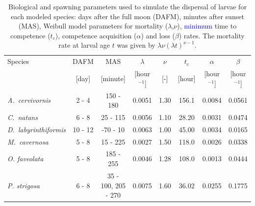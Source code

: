 \documentclass[preprint,12pt,authoryear]{elsarticle}
\newcommand{\modif}[1]{\textcolor{blue}{#1}}
\begin{document}
	\begin{table}
		\begin{adjustwidth}{-1in}{-1in}
			\centering
			\footnotesize
			\begin{tabular}{lccccccc}
				\hline
				Species & DAFM  & MAS      &  $\lambda$     & $\nu$ & $t_c$  & $\alpha$      & $\beta$ \\
				& [day] & [minute] &  [hour$^{-1}$] & [-]   & [hour] & [hour$^{-1}$] & [hour$^{-1}$] \\
				\hline
				\textit{A.~cervivornis} & 2 - 4 & 150 - 180 & 0.0051 & 1.30 & 156.1 & 0.0084 & 0.0561 \\
				\textit{C.~natans}      & 6 - 8 & 25 - 115  &  0.0056 & 1.10 & 28.20 & 0.0031 & 0.0474 \\
				\textit{D.~labyrinthiformis} & 10 - 12 & -70 - 10 & 0.0063 & 1.00 &  45.00 & 0.0034 & 0.0165 \\
				\textit{M.~cavernosa}   & 5 - 8 & 15 - 225 & 0.0027 & 1.50 & 118.0 & 0.0026 & 0.0338 \\
				\textit{O. faveolata}   & 5 - 8 & 185 - 255 &  0.0046 & 1.28 & 108.0 & 0.0013 & 0.0444 \\
				\textit{P. strigosa}    & 6 - 8 &  35 - 100, 205 - 270 & 0.0075 & 1.60 & 36.02 & 0.0255 & 0.1775 \\
				\hline
			\end{tabular}
		\end{adjustwidth}
		\caption{Biological and spawning parameters used to simulate the dispersal of larvae for each modeled species: days after the full moon (DAFM), minutes after sunset (MAS), Weibull model parameters for mortality ($\lambda$,$\nu$), \modif{minimum} time to competence ($t_c$), competence acquisition ($\alpha$) and loss ($\beta$) rates. The mortality rate at larval age $t$ was given by $\lambda\nu(\lambda t)^{\nu-1}$.}\label{tab:species}
	\end{table}
	
\end{document}
